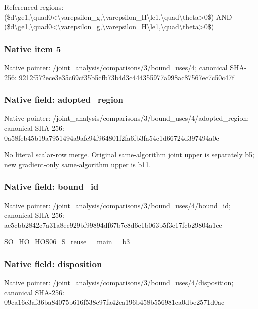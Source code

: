 \documentclass[10pt,a4paper]{article}
\begin{document}
\begingroup\raggedright\sloppy Referenced regions:\allowbreak{} (\$d\textbackslash{}ge1,\allowbreak{}\textbackslash{}quad0<\textbackslash{}varepsilon\_\allowbreak{}g,\allowbreak{}\textbackslash{}varepsilon\_\allowbreak{}H\textbackslash{}le1,\allowbreak{}\textbackslash{}quad\textbackslash{}theta>0\$) AND (\$d\textbackslash{}ge1,\allowbreak{}\textbackslash{}quad0<\textbackslash{}varepsilon\_\allowbreak{}g,\allowbreak{}\textbackslash{}varepsilon\_\allowbreak{}H\textbackslash{}le1,\allowbreak{}\textbackslash{}quad\textbackslash{}theta>0\$)\par\endgroup

\subsubsection{Native item 5}
Native pointer: /joint\_\allowbreak{}analysis/comparisons/3/bound\_\allowbreak{}uses/4; canonical SHA-256: 9212f572ece3e35c69cf35b5cfb73b4d3c444355977a998ac87567ec7c50c47f

\subsubsection{Native field: adopted\_\allowbreak{}region}
Native pointer: /joint\_\allowbreak{}analysis/comparisons/3/bound\_\allowbreak{}uses/4/adopted\_\allowbreak{}region; canonical SHA-256: 0a58feb45b19a7951494a9afc94f964801f2fa6fb3fa54c1d66724d397494a0c

\begingroup\raggedright\sloppy No literal scalar-row merge. Original same-algorithm joint upper is separately b5;\allowbreak{} new gradient-only same-algorithm upper is b11.\par\endgroup

\subsubsection{Native field: bound\_\allowbreak{}id}
Native pointer: /joint\_\allowbreak{}analysis/comparisons/3/bound\_\allowbreak{}uses/4/bound\_\allowbreak{}id; canonical SHA-256: ae5cbb2842c7a31a8ec929bf99894df67b7e8d6e1b063b5f3e17fcb29804a1ce

\begingroup\raggedright\sloppy SO\_\allowbreak{}HO\_\allowbreak{}HOS06\_\allowbreak{}S\_\allowbreak{}reuse\_\allowbreak{}\_\allowbreak{}main\_\allowbreak{}\_\allowbreak{}b3\par\endgroup

\subsubsection{Native field: disposition}
Native pointer: /joint\_\allowbreak{}analysis/comparisons/3/bound\_\allowbreak{}uses/4/disposition; canonical SHA-256: 09ca16e3af36ba84075b616f538c97fa42ea196b458b556981ca0dbe2571d0ac
\end{document}
